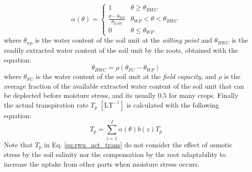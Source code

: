 \documentclass[a4paper,12pt]{article}
\begin{document}
 \begin{equation} \label{eq:rwu_stress_func}
  \alpha(\theta)=%
  \begin{cases}
    1 & \theta\geq\theta_{RWC} \\
    \frac{\theta-\theta_{WP}}{\theta_{RAW}} & \theta_{WP}<\theta<\theta_{RWC}\\
    0 & \theta\leq\theta_{WP}
  \end{cases}
\end{equation}
where $\theta_{wp}$ is the water content of the soil unit at the \emph{wilting point} and $\theta_{RWC}$ is the readily extracted water content of the soil unit by the roots, obtained with the equation:
\begin{equation} \label{eq:rwu_root_stress}
    \theta_{RWC}=\rho(\theta_{FC}-\theta_{WP})
\end{equation}
where $\theta_{FC}$ is the water content of the soil unit at the \emph{field capacity}, and $\rho$ is the average fraction of the available extracted water content of the soil unit that can be deplected before moisture stress, and its usually $0.5$ for many crops.
Finally the actual transpiration rate $T_p$ $\mathrm{[LT^{-1}]}$ is calculated with the following equation:
\begin{equation} \label{eq:rwu_act_trans}
    T_p=\sum\limits_{i=1}^{I}\alpha(\theta)b(z)T_p
\end{equation}
Note that $T_p$ in Eq. \ref{eq:rwu_act_trans} do not consider the effect of osmotic stress by the soil salinity nor the compensation by the root adaptability to increase the uptake from other parts when moisture stress occurs. 
\end{document}
